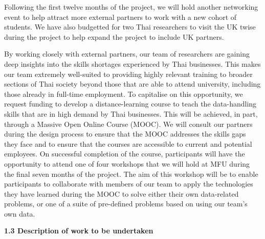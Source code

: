 \documentclass[11pt]{article}
\begin{document}
  Following the first twelve months of the project, we will hold another networking event to help attract more external partners to work with a new cohort of students. We have also budgetted for two Thai researchers to visit the UK twise during the project to help expand the project to include UK partners.
  
  \noindent
  By working closely with external partners, our team of researchers are gaining deep insights into the skills shortages experienced by Thai businesses. This makes our team extremely well-suited to providing highly relevant training to broader sections of Thai society beyond those that are able to attend university, including those already in full-time employment. To capitalise on this opportunity, we request funding to develop a distance-learning course to teach the data-handling skills that are in high demand by Thai businesses. This will be achieved, in part, through a Massive Open Online Course (MOOC). We will consult our partners during the design process to ensure that the MOOC addresses the skills gaps they face and to ensure that the courses are accessible to current and potential employees. On successful completion of the course, participants will have the opportunity to attend one of four workshops that we will hold at MFU during the final seven months of the project. The aim of this workshop will be to enable participants to collaborate with members of our team to apply the technologies they have learned during the MOOC to solve either their own data-related problems, or one of a suite of pre-defined problems based on using our team's own data.
  
  \vspace{2mm}
  \noindent
  {\large \bf 1.3 Description of work to be undertaken}
    
\end{document}
